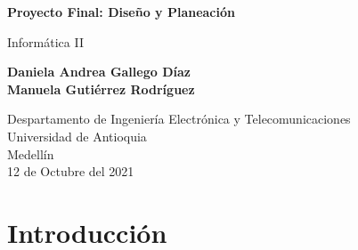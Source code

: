 \documentclass{article}
\begin{document}
\begin{titlepage}
    \begin{center}
        \vspace*{1cm}
            
        \Huge
        \textbf {Proyecto Final: Diseño y Planeación}
            
        \vspace{0.5cm}
        \LARGE
        Informática II
            
        \vspace{1.5cm}
            
        \textbf{Daniela Andrea Gallego Díaz\\ Manuela Gutiérrez Rodríguez }
            
        \vfill
            
        \vspace{0.8cm}
            
        \Large
        Despartamento de Ingeniería Electrónica y Telecomunicaciones\\
        Universidad de Antioquia\\
        Medellín\\
        12 de Octubre del 2021
            
    \end{center}
\end{titlepage}

\tableofcontents
\newpage

\section{Introducción} \label{Introducción}
\end{document}
